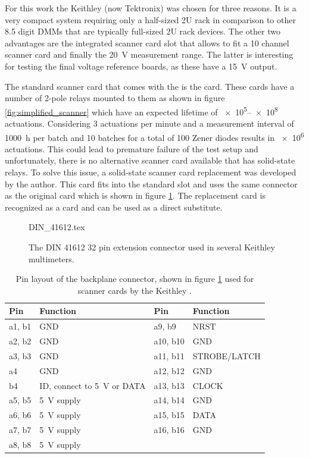 For this work the Keithley (now Tektronix)  was chosen for three reasons. It is a very compact system requiring only a half-sized 2U rack in comparison to other \num{8.5} digit DMMs that are typically full-sized 2U rack devices. The other two advantages are the integrated scanner card slot that allows to fit a 10 channel scanner card and finally the \qty{20}{\volt} measurement range. The latter is interesting for testing the final voltage reference boards, as these have a \qty{15}{\volt} output.

The standard scanner card that comes with the  is the  card. These cards have a number of 2-pole relays mounted to them as shown in figure \ref{fig:simplified_scanner} which have an expected lifetime of \numrange[range-phrase={~to~}]{e5}{e8} actuations. Considering \num{3} actuations per minute and a measurement interval of \qty{1000}{\hour} per batch and \num{10} batches for a total of \num{100} Zener diodes results in \num{e6} actuations. This could lead to premature failure of the test setup and unfortunately, there is no alternative scanner card available that has solid-state relays. To solve this issue, a solid-state scanner card replacement was developed by the author. This card fits into the standard slot and uses the same connector as the original card which is shown in figure \ref{fig:connector_scan2000}. The replacement card is recognized as a  card and can be used as a direct substitute.
\begin{figure}[ht]
    \centering
    {DIN_41612.tex}
    \caption{The DIN 41612 \num{32} pin extension connector used in several Keithley multimeters.}
    \label{fig:connector_scan2000}
\end{figure}

\begin{table}[ht]
    \centering
    \begin{tabular}{llll}
        \toprule
        Pin& Function& Pin& Function\\
        \midrule
        a1, b1& GND& a9, b9& $\overline{\text{NRST}}$\\
        a2, b2& GND& a10, b10& GND\\
        a3, b3& GND& a11, b11& STROBE/LATCH\\
        a4    & GND& a12, b12& GND\\
        b4    & ID, connect to \qty{5}{\V} or DATA& a13, b13& CLOCK\\
        a5, b5& \qty{5}{\V} supply& a14, b14& GND\\
        a6, b6& \qty{5}{\V} supply& a15, b15& DATA\\
        a7, b7& \qty{5}{\V} supply& a16, b16& GND\\
        a8, b8& \qty{5}{\V} supply&&\\
        \bottomrule
    \end{tabular}
    \caption{Pin layout of the backplane connector, shown in figure \ref{fig:connector_scan2000} used for scanner cards by the Keithley .}
    \label{tab:connector_scan2000}
\end{table}


